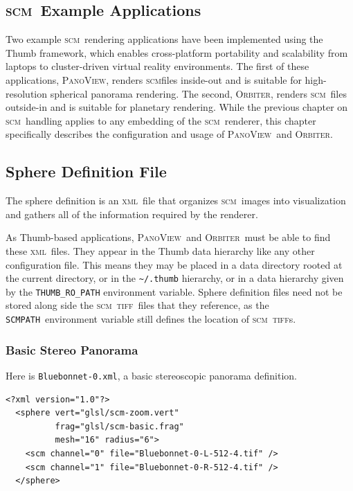 \documentclass[oneside,10pt]{memoir}
\newcommand{\scm}     {\textsc{scm}}
\newcommand{\tiff}    {\textsc{tiff}}
\newcommand{\xml}     {\textsc{xml}}
\newcommand{\scmpath}{\texttt{SCMPATH}}
\newcommand{\panoview}{\textsc{PanoView}}
\newcommand{\orbiter} {\textsc{Orbiter}}
\begin{document}
\begin{Spacing}{1.1}

\chapter{\scm\ Example Applications}

Two example \scm\ rendering applications have been implemented using the Thumb framework, which enables cross-platform portability and scalability from laptops to cluster-driven virtual reality environments. The first of these applications, \panoview, renders \scm files inside-out and is suitable for high-resolution spherical panorama rendering. The second, \orbiter, renders \scm\ files outside-in and is suitable for planetary rendering. While the previous chapter on \scm\ handling applies to any embedding of the \scm\ renderer, this chapter specifically describes the configuration and usage of \panoview\ and \orbiter.

\section{Sphere Definition File}
\label{sec:scmxml}

The sphere definition is an \xml\ file that organizes \scm\ images into visualization and gathers all of the information required by the renderer.

As Thumb-based applications, \panoview\ and \orbiter\ must be able to find these \xml\ files. They appear in the Thumb data hierarchy like any other configuration file. This means they may be placed in a data directory rooted at the current directory, or in the \texttt{\textasciitilde/.thumb} hierarchy, or in a data hierarchy given by the \verb|THUMB_RO_PATH| environment variable. Sphere definition files need not be stored along side the \scm\ \tiff\ files that they reference, as the \scmpath\ environment variable still defines the location of \scm\ \tiff s.

\subsection{Basic Stereo Panorama}

Here is \texttt{Bluebonnet-0.xml}, a basic stereoscopic panorama definition.

\begin{Verbatim}
<?xml version="1.0"?>
  <sphere vert="glsl/scm-zoom.vert"
          frag="glsl/scm-basic.frag"
          mesh="16" radius="6">
    <scm channel="0" file="Bluebonnet-0-L-512-4.tif" />
    <scm channel="1" file="Bluebonnet-0-R-512-4.tif" />
  </sphere>
\end{Verbatim}


\end{Spacing}
\end{document}
